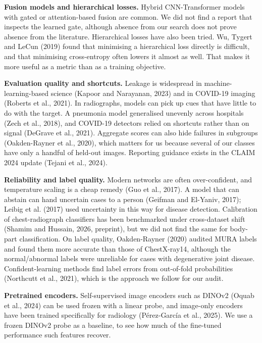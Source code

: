 

\textbf{Fusion models and hierarchical losses.} Hybrid CNN-Transformer models with gated or attention-based fusion are common. We did not find a report that inspects the learned gate, although absence from our search does not prove absence from the literature. Hierarchical losses have also been tried. Wu, Tygert and LeCun (2019) found that minimising a hierarchical loss directly is difficult, and that minimising cross-entropy often lowers it almost as well. That makes it more useful as a metric than as a training objective.

\textbf{Evaluation quality and shortcuts.} Leakage is widespread in machine-learning-based science (Kapoor and Narayanan, 2023) and in COVID-19 imaging (Roberts et al., 2021). In radiographs, models can pick up cues that have little to do with the target. A pneumonia model generalised unevenly across hospitals (Zech et al., 2018), and COVID-19 detectors relied on shortcuts rather than on signal (DeGrave et al., 2021). Aggregate scores can also hide failures in subgroups (Oakden-Rayner et al., 2020), which matters for us because several of our classes have only a handful of held-out images. Reporting guidance exists in the CLAIM 2024 update (Tejani et al., 2024).

\textbf{Reliability and label quality.} Modern networks are often over-confident, and temperature scaling is a cheap remedy (Guo et al., 2017). A model that can abstain can hand uncertain cases to a person (Geifman and El-Yaniv, 2017); Leibig et al. (2017) used uncertainty in this way for disease detection. Calibration of chest-radiograph classifiers has been benchmarked under cross-dataset shift (Shamim and Hussain, 2026, preprint), but we did not find the same for body-part classification. On label quality, Oakden-Rayner (2020) audited MURA labels and found them more accurate than those of ChestX-ray14, although the normal/abnormal labels were unreliable for cases with degenerative joint disease. Confident-learning methods find label errors from out-of-fold probabilities (Northcutt et al., 2021), which is the approach we follow for our audit.

\textbf{Pretrained encoders.} Self-supervised image encoders such as DINOv2 (Oquab et al., 2024) can be used frozen with a linear probe, and image-only encoders have been trained specifically for radiology (Pérez-García et al., 2025). We use a frozen DINOv2 probe as a baseline, to see how much of the fine-tuned performance such features recover.

